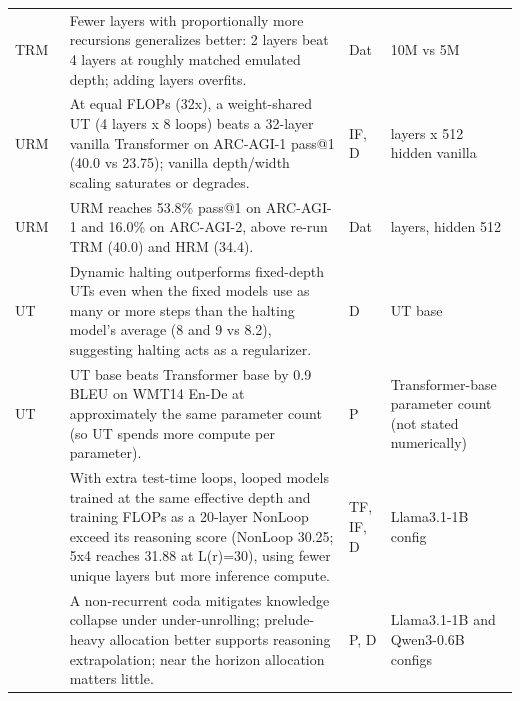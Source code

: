 \begin{longtable}{@{}>{\raggedright\arraybackslash}p{2.7cm}>{\raggedright\arraybackslash}p{7.9cm}>{\raggedright\arraybackslash}p{1.3cm}>{\raggedright\arraybackslash}p{2.5cm}@{}}
TRM~\citep{ax2510.04871} & Fewer layers with proportionally more recursions generalizes better: 2 layers beat 4 layers at roughly matched emulated depth; adding layers overfits. & Dat & 10M vs 5M \\
URM~\citep{ax2512.14693} & At equal FLOPs (32x), a weight-shared UT (4 layers x 8 loops) beats a 32-layer vanilla Transformer on ARC-AGI-1 pass@1 (40.0 vs 23.75); vanilla depth/width scaling saturates or degrades. & IF, D & 32 layers x 512 hidden vanilla \\
URM~\citep{ax2512.14693} & URM reaches 53.8\% pass@1 on ARC-AGI-1 and 16.0\% on ARC-AGI-2, above re-run TRM (40.0) and HRM (34.4). & Dat & 4 layers, hidden 512 \\
UT~\citep{ax1807.03819} & Dynamic halting outperforms fixed-depth UTs even when the fixed models use as many or more steps than the halting model's average (8 and 9 vs 8.2), suggesting halting acts as a regularizer. & D & UT base \\
UT~\citep{ax1807.03819} & UT base beats Transformer base by 0.9 BLEU on WMT14 En-De at approximately the same parameter count (so UT spends more compute per parameter). & P & Transformer-base parameter count (not stated numerically) \\
\citep{ax2609.36636} & With extra test-time loops, looped models trained at the same effective depth and training FLOPs as a 20-layer NonLoop exceed its reasoning score (NonLoop 30.25; 5x4 reaches 31.88 at L(r)=30), using fewer unique layers but more inference compute. & TF, IF, D & Llama3.1-1B config \\
\citep{ax2609.36636} & A non-recurrent coda mitigates knowledge collapse under under-unrolling; prelude-heavy allocation better supports reasoning extrapolation; near the horizon allocation matters little. & P, D & Llama3.1-1B and Qwen3-0.6B configs \\
\end{longtable}
